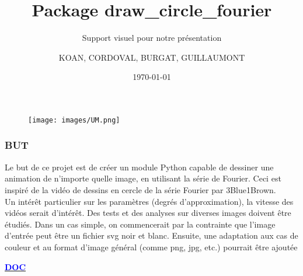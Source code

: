 \documentclass[aspectratio=169]{beamer}
\author{KOAN, CORDOVAL, BURGAT, GUILLAUMONT }
\title[Présentation du Projet de Développement Logiciel]{Package draw\_circle\_fourier}%
\subtitle{Support visuel pour notre présentation}
\institute{Université de Montpellier}
\date{\today}%
\begin{document}
\begin{frame}
    \titlepage
    \vspace{-10pt}
    \begin{figure}[htpb]
        \begin{center}
            \texttt{[image: images/UM.png]}
        \end{center}
    \end{figure}
\end{frame}


\begin{frame}
\frametitle{BUT }

Le but de ce projet est de créer un module Python capable de dessiner une animation de n'importe quelle image, en utilisant la série de Fourier. Ceci est inspiré de la vidéo de dessins en cercle de la série Fourier par 3Blue1Brown.
\\


Un intérêt particulier sur les paramètres (degrés d'approximation), la vitesse des vidéos serait d'intérêt. Des tests et des analyses sur diverses images doivent être étudiés. Dans un cas simple, on commencerait par la contrainte que l'image d'entrée peut être un fichier svg noir et blanc. Ensuite, une adaptation aux cas de couleur et au format d'image général (comme png, jpg, etc.) pourrait être ajoutée


\href{https://draw-fourier-circle.readthedocs.io/en/latest/fourier/gallery/examples.html}{\textcolor{blue}{\textbf{DOC}}}


\end{frame}
\end{document}
